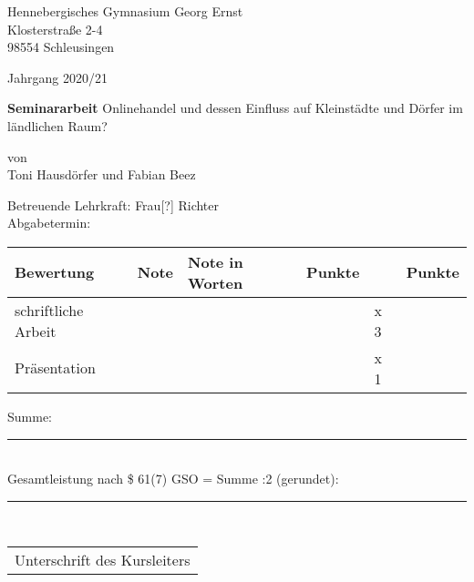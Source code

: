 \begin{titlepage}

    \raggedright
        Hennebergisches Gymnasium Georg Ernst\\
        Klosterstraße 2-4\\
        98554 Schleusingen
        
    \raggedleft\vspace*{-1.9cm}
        Jahrgang 2020/21
        
    
    \vfill\vfill\vfill\vfill\vfill\vfill

    \centering
        \LARGE\textbf{Seminararbeit}
        \vfill
        \large Onlinehandel und dessen Einfluss auf Kleinstädte und Dörfer im ländlichen Raum?\\[\baselineskip]\vfill
        
        von\\
        Toni Hausdörfer und Fabian Beez
    

    \vfill\vfill\vfill\vfill

    \raggedright
    Betreuende Lehrkraft:   Frau[?] Richter\\
    Abgabetermin:\\[\baselineskip]
    
\begin{tabular}[h]{|l|l|l|l|l|l|}
    \hline
    Bewertung & Note & Note in Worten & Punkte &  & Punkte \\
    \hline
    schriftliche Arbeit & & & & x 3 & \\
    \hline
    Präsentation & & & & x 1 & \\
    \hline
\end{tabular}

\vfill

\raggedleft
    Summe: \rule{1.5cm}{.4pt}\\
    Gesamtleistung nach \$ 61(7) GSO = Summe :2 (gerundet): \rule{1.5cm}{.4pt}\\[\baselineskip]\vfill\vfill\vfill
    \begin{tabular}{@{}l@{}}\hline
        Unterschrift des Kursleiters
    \end{tabular}
    
\vfill\vfill
\end{titlepage}

\newpage
